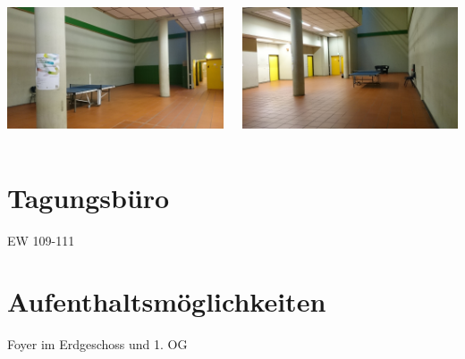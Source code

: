 \documentclass[compress,]{beamer}
\begin{document}
\begin{frame}
  \begin{columns}[onlytextwidth]
    \begin{column}[0.5\textwidth]
      \includegraphics[width=\textwidth]{images/bunker1.JPG}
    \end{column}
    \begin{column}[0.5\textwidth]
      \includegraphics[width=\textwidth]{images/bunker2.JPG}
    \end{column}
  \end{columns}
\end{frame}


\section{Tagungsbüro}
\begin{frame}{EW 109-111}
\end{frame}


\section{Aufenthaltsmöglichkeiten}
\begin{frame}{Foyer im Erdgeschoss und 1. OG}
\end{frame}
\end{document}
